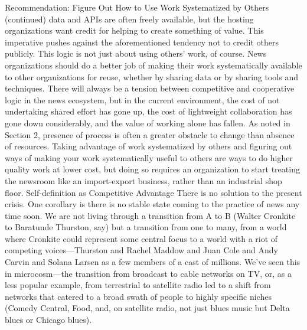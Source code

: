 Recommendation: Figure Out How to Use Work Systematized by Others
(continued)
data and APIs are often freely available, but the hosting organizations
want credit for helping to create something of value. This imperative
pushes against the aforementioned tendency not to credit others publicly.
This logic is not just about using others’ work, of course. News organizations
should do a better job of making their work systematically
available to other organizations for reuse, whether by sharing data or by
sharing tools and techniques. There will always be a tension between
competitive and cooperative logic in the news ecosystem, but in the
current environment, the cost of not undertaking shared effort has gone
up, the cost of lightweight collaboration has gone down considerably,
and the value of working alone has fallen.
As noted in Section 2, presence of process is often a greater obstacle to
change than absence of resources. Taking advantage of work systematized
by others and figuring out ways of making your work systematically
useful to others are ways to do higher quality work at lower cost,
but doing so requires an organization to start treating the newsroom like
an import-export business, rather than an industrial shop floor.
Self-definition as Competitive Advantage
There is no solution to the present crisis. One corollary is there is no stable state
coming to the practice of news any time soon. We are not living through a transition
from A to B (Walter Cronkite to Baratunde Thurston, say) but a transition from
one to many, from a world where Cronkite could represent some central focus to a
world with a riot of competing voices—Thurston and Rachel Maddow and Juan
Cole and Andy Carvin and Solana Larsen as a few members of a cast of millions.
We’ve seen this in microcosm—the transition from broadcast to cable networks
on TV, or, as a less popular example, from terrestrial to satellite radio led to a shift
from networks that catered to a broad swath of people to highly specific niches
(Comedy Central, Food, and, on satellite radio, not just blues music but Delta
blues or Chicago blues).


